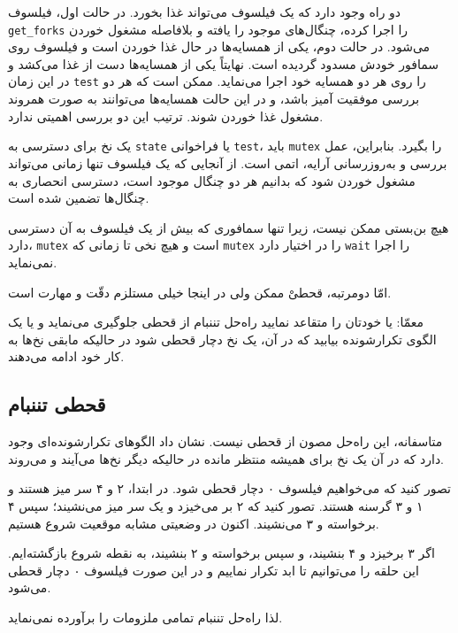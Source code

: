 \documentclass{book}
\newcommand{\clearemptydoublepage}{\newpage\cleardoublepage}
\begin{document}
    دو راه وجود دارد که یک فیلسوف می‌تواند غذا بخورد. در حالت اول، فیلسوف {\tt get\_forks} را اجرا کرده، 
    چنگال‌های موجود را یافته و 
    بلافاصله مشغول خوردن می‌شود. در حالت دوم، یکی از همسایه‌ها در حال غذا خوردن است 
    و فیلسوف روی سمافور خودش مسدود گردیده است. 
    نهایتاً یکی از همسایه‌ها دست از غذا می‌کشد و در این زمان  {\tt test} را روی هر دو همسایه خود اجرا می‌نماید. 
    ممکن است که هر دو بررسی موفقیت آمیز باشد، و در این حالت همسایه‌ها می‌توانند به صورت همروند مشغول غذا خوردن شوند. 
    ترتیب این دو بررسی اهمیتی ندارد. 

    یک نخ برای دسترسی به {\tt state} یا فراخوانی {\tt test}، باید {\tt mutex} را بگیرد. 
    بنابراین، عمل بررسی و به‌روزرسانی آرایه، اتمی است. از آنجایی که یک فیلسوف تنها زمانی می‌تواند 
    مشغول خوردن شود که بدانیم هر دو چنگال موجود است، 
    دسترسی انحصاری به چنگال‌ها تضمین شده است. 

    هیچ بن‌بستی ممکن نیست، زیرا تنها سمافوری که بیش از یک فیلسوف به آن دسترسی دارد، {\tt mutex} است و هیچ نخی  
    تا زمانی که {\tt mutex} را در اختیار دارد {\tt wait} را اجرا نمی‌نماید. 

    امّا دومرتبه، قحطیْ ممکن ولی در اینجا خیلی مستلزم دقّت و مهارت است.

    معمّا: یا خودتان را متقاعد نمایید راه‌حل تننبام از قحطی جلوگیری می‌نماید و یا یک الگوی تکرارشونده بیابید که در آن، 
    یک نخ دچار قحطی شود در حالیکه مابقی نخ‌ها به کار خود ادامه می‌دهند. 


\clearemptydoublepage
\subsection{قحطی تننبام}

    متاسفانه، این راه‌حل مصون از قحطی نیست.  نشان داد الگوهای تکرارشونده‌ای وجود دارد که 
    در آن یک نخ برای همیشه منتظر مانده در حالیکه دیگر نخ‌ها می‌آیند و می‌روند\cite{gingras90dining}.

    تصور کنید که می‌خواهیم فیلسوف ۰ دچار قحطی شود. در ابتدا، ۲ و ۴ سر میز هستند و ۱ و ۳ گرسنه هستند. 
    تصور کنید که ۲ بر می‌خیزد و یک سر میز می‌نشیند؛ 
    سپس ۴ برخواسته و ۳ می‌نشیند. اکنون در وضعیتی مشابه موقعیت شروع هستیم. 

    اگر ۳ برخیزد و ۴ بنشیند، و سپس  برخواسته و ۲ بنشیند، به نقطه شروع بازگشته‌ایم. 
    این  حلقه را می‌توانیم تا ابد تکرار نماییم و در این صورت فیلسوف ۰ دچار قحطی می‌شود. 

    لذا راه‌حل تننبام تمامی ملزومات را برآورده نمی‌نماید. 
\end{document}

